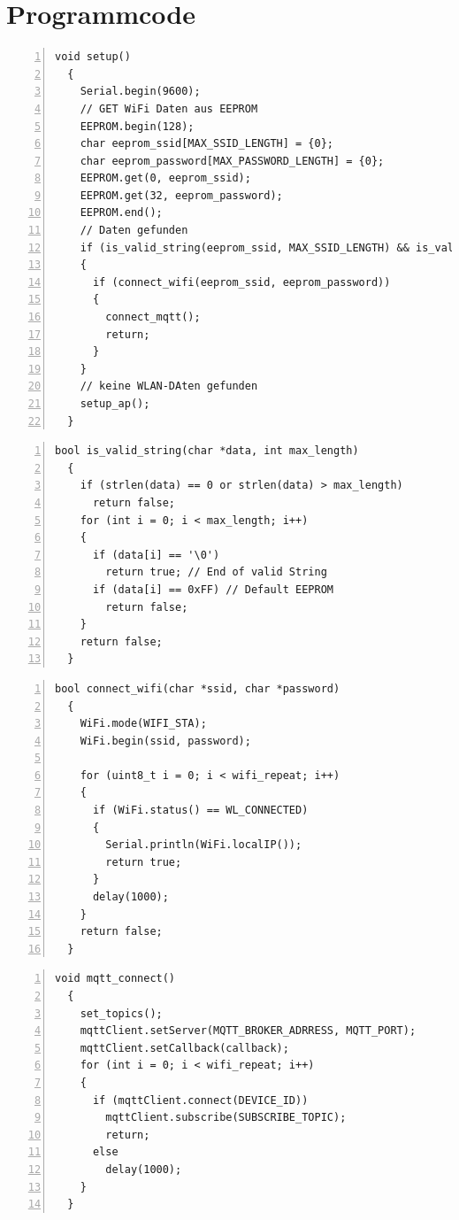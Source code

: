 \documentclass[12pt, letterpaper]{article}
\begin{document}
\listoffigures
{}

\listoftables
\newpage
\section{Programmcode}

\begin{lstlisting}[frame=single, style=cpp, numbers=left, label={lst:esp8266setup}, caption={ESP: setup}]
  void setup()
  {
    Serial.begin(9600);
    // GET WiFi Daten aus EEPROM
    EEPROM.begin(128);
    char eeprom_ssid[MAX_SSID_LENGTH] = {0};
    char eeprom_password[MAX_PASSWORD_LENGTH] = {0};
    EEPROM.get(0, eeprom_ssid);
    EEPROM.get(32, eeprom_password);
    EEPROM.end();
    // Daten gefunden
    if (is_valid_string(eeprom_ssid, MAX_SSID_LENGTH) && is_valid_string(eeprom_password, MAX_PASSWORD_LENGTH))
    {
      if (connect_wifi(eeprom_ssid, eeprom_password))
      {
        connect_mqtt();
        return;
      }
    }
    // keine WLAN-DAten gefunden
    setup_ap();
  }
\end{lstlisting}
\begin{lstlisting}[frame=single, style=cpp, numbers=left, label={lst:esp8266validstring}, caption={ESP: is\_valid\_string}]
  bool is_valid_string(char *data, int max_length)
  {
    if (strlen(data) == 0 or strlen(data) > max_length)
      return false;
    for (int i = 0; i < max_length; i++)
    {
      if (data[i] == '\0')
        return true; // End of valid String
      if (data[i] == 0xFF) // Default EEPROM
        return false;
    }
    return false;
  }
\end{lstlisting}
\begin{lstlisting}[frame=single, style=cpp, numbers=left, label={lst:espconnectwifi}, caption={ESP: connect\_wifi}]
  bool connect_wifi(char *ssid, char *password)
  {
    WiFi.mode(WIFI_STA);
    WiFi.begin(ssid, password);
  
    for (uint8_t i = 0; i < wifi_repeat; i++)
    {
      if (WiFi.status() == WL_CONNECTED)
      {
        Serial.println(WiFi.localIP());
        return true;
      }
      delay(1000);
    }
    return false;
  }
\end{lstlisting}
\begin{lstlisting}[frame=single, style=cpp, numbers=left, label={lst:espconnectmqtt}, caption={ESP: connect\_mqtt}]
  void mqtt_connect()
  {
    set_topics();
    mqttClient.setServer(MQTT_BROKER_ADRRESS, MQTT_PORT);
    mqttClient.setCallback(callback);
    for (int i = 0; i < wifi_repeat; i++)
    {
      if (mqttClient.connect(DEVICE_ID))
        mqttClient.subscribe(SUBSCRIBE_TOPIC);
        return;
      else
        delay(1000);
    }
  }
\end{lstlisting}
\end{document}
